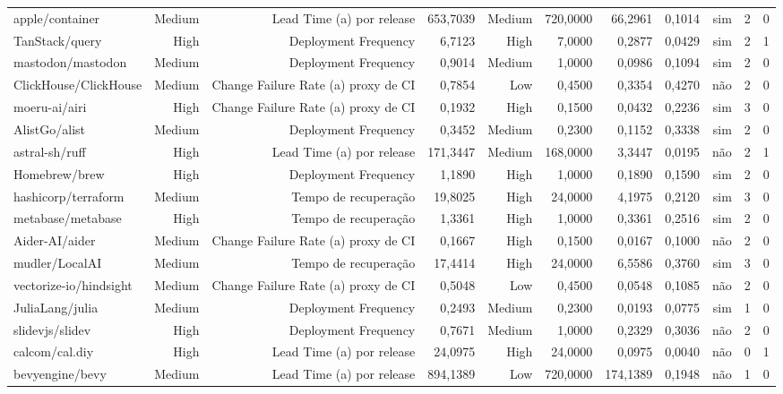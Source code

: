 \begin{tabular}{lrrrrrrrrrr}
apple/container & Medium & Lead Time (a) por release & 653,7039 & Medium & 720,0000 & 66,2961 & 0,1014 & sim & 2 & 0 \\
TanStack/query & High & Deployment Frequency & 6,7123 & High & 7,0000 & 0,2877 & 0,0429 & sim & 2 & 1 \\
mastodon/mastodon & Medium & Deployment Frequency & 0,9014 & Medium & 1,0000 & 0,0986 & 0,1094 & sim & 2 & 0 \\
ClickHouse/ClickHouse & Medium & Change Failure Rate (a) proxy de CI & 0,7854 & Low & 0,4500 & 0,3354 & 0,4270 & não & 2 & 0 \\
moeru-ai/airi & High & Change Failure Rate (a) proxy de CI & 0,1932 & High & 0,1500 & 0,0432 & 0,2236 & sim & 3 & 0 \\
AlistGo/alist & Medium & Deployment Frequency & 0,3452 & Medium & 0,2300 & 0,1152 & 0,3338 & sim & 2 & 0 \\
astral-sh/ruff & High & Lead Time (a) por release & 171,3447 & Medium & 168,0000 & 3,3447 & 0,0195 & não & 2 & 1 \\
Homebrew/brew & High & Deployment Frequency & 1,1890 & High & 1,0000 & 0,1890 & 0,1590 & sim & 2 & 0 \\
hashicorp/terraform & Medium & Tempo de recuperação & 19,8025 & High & 24,0000 & 4,1975 & 0,2120 & sim & 3 & 0 \\
metabase/metabase & High & Tempo de recuperação & 1,3361 & High & 1,0000 & 0,3361 & 0,2516 & sim & 2 & 0 \\
Aider-AI/aider & Medium & Change Failure Rate (a) proxy de CI & 0,1667 & High & 0,1500 & 0,0167 & 0,1000 & não & 2 & 0 \\
mudler/LocalAI & Medium & Tempo de recuperação & 17,4414 & High & 24,0000 & 6,5586 & 0,3760 & sim & 3 & 0 \\
vectorize-io/hindsight & Medium & Change Failure Rate (a) proxy de CI & 0,5048 & Low & 0,4500 & 0,0548 & 0,1085 & não & 2 & 0 \\
JuliaLang/julia & Medium & Deployment Frequency & 0,2493 & Medium & 0,2300 & 0,0193 & 0,0775 & sim & 1 & 0 \\
slidevjs/slidev & High & Deployment Frequency & 0,7671 & Medium & 1,0000 & 0,2329 & 0,3036 & não & 2 & 0 \\
calcom/cal.diy & High & Lead Time (a) por release & 24,0975 & High & 24,0000 & 0,0975 & 0,0040 & não & 0 & 1 \\
bevyengine/bevy & Medium & Lead Time (a) por release & 894,1389 & Low & 720,0000 & 174,1389 & 0,1948 & não & 1 & 0 \\

\end{tabular}
